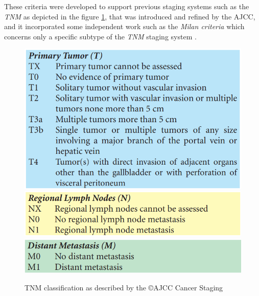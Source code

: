 \documentclass[]{article}
\begin{document}
These criteria were developed to support previous staging systems such
as the \emph{TNM} as depicted in the figure \ref{TNM}, that was introduced and refined by
the AJCC, and it incorporated some independent work such as the
\emph{Milan criteria} which concerns only a specific subtype of the
\emph{TNM} staging system \cite{Mazzaferro1996}.


\begin{figure}[ht!]
\centering
\includegraphics[width=0.4\linewidth]{images/image2} \\
\includegraphics[width=0.4\linewidth]{images/image11} \\
\includegraphics[width=0.4\linewidth]{images/image14} \\
\caption{TNM classification as described by the ©AJCC Cancer Staging \cite{Edge2010}}
\label{TNM}
\end{figure}
\end{document}
